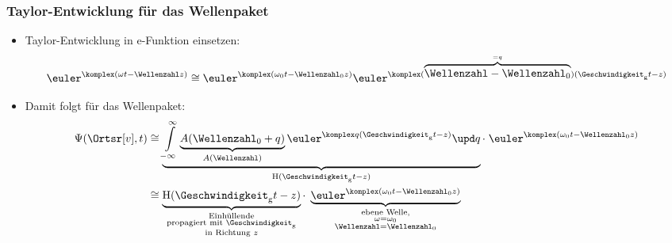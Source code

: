  \begin{frame}
  \frametitle{Taylor-Entwicklung für das Wellenpaket}
      \begin{itemize}[<+->]
      \item Taylor-Entwicklung in e-Funktion einsetzen:
        \begin{equation*}
          \euler^{\komplex (\omega t - \Wellenzahl z)} \cong \euler^{\komplex(\omega_0 t - \Wellenzahl_0 z)} \euler^{\komplex (\overbrace{\Wellenzahl - \Wellenzahl_0}^{=q})(\Geschwindigkeit_{\mathrm{g}} t - z)}
        \end{equation*}
        \item Damit folgt für das Wellenpaket:
        \begin{align*}
\Psi (\Ortsr[v], t) &\cong \underbrace{\int\limits_{-\infty}^{\infty} \underbrace{A(\Wellenzahl_0 + q)}_{A(\Wellenzahl)}\euler^{\komplex q (\Geschwindigkeit_{\mathrm{g}} t - z)}\upd q}_{\mathrm{H}(\Geschwindigkeit_{\mathrm{g}} t -z)} \cdot\; \euler^{\komplex ( \omega_0 t - \Wellenzahl_0 z)}\\
& \cong \underbrace{\mathrm{H}(\Geschwindigkeit_{\mathrm{g}} t -z)}_{\substack{\text{Einhüllende}\\ \text{propagiert mit }\Geschwindigkeit_{\mathrm{g}}\\ \text{in Richtung $z$}}}\cdot\; \underbrace{\euler^{\komplex (\omega_0 t - \Wellenzahl_0 z)}}_{\substack{\text{ebene Welle,}\\ \omega = \omega_0\\ \Wellenzahl = \Wellenzahl_0}}
\end{align*}

 \end{itemize}
  \end{frame}

